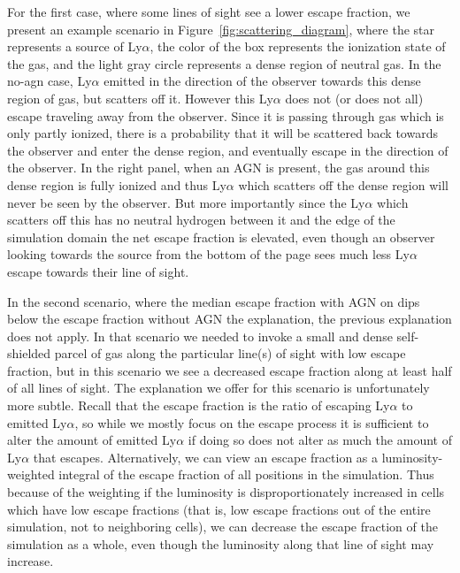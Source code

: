 For the first case, where some lines of sight see a lower escape fraction, we present an example scenario in Figure~\ref{fig:scattering_diagram}, where the star represents a source of Ly$\alpha$, the color of the box represents the ionization state of the gas, and the light gray circle represents a dense region of neutral gas.
In the no-agn case, Ly$\alpha$ emitted in the direction of the observer towards this dense region of gas, but scatters off it.
However this Ly$\alpha$ does not (or does not all) escape traveling away from the observer.
Since it is passing through gas which is only partly ionized, there is a probability that it will be scattered back towards the observer and enter the dense region, and eventually escape in the direction of the observer.
In the right panel, when an AGN is present, the gas around this dense region is fully ionized and thus Ly$\alpha$ which scatters off the dense region will never be seen by the observer.
But more importantly since the Ly$\alpha$ which scatters off this has no neutral hydrogen between it and the edge of the simulation domain the net escape fraction is elevated, even though an observer looking towards the source from the bottom of the page sees much less Ly$\alpha$ escape towards their line of sight.

In the second scenario, where the median escape fraction with AGN on dips below the escape fraction without AGN the explanation, the previous explanation does not apply.
In that scenario we needed to invoke a small and dense self-shielded parcel of gas along the particular line(s) of sight with low escape fraction, but in this scenario we see a decreased escape fraction along at least half of all lines of sight.
The explanation we offer for this scenario is unfortunately more subtle.
Recall that the escape fraction is the ratio of escaping Ly$\alpha$ to emitted Ly$\alpha$, so while we mostly focus on the escape process it is sufficient to alter the amount of emitted Ly$\alpha$ if doing so does not alter as much the amount of Ly$\alpha$ that escapes.
Alternatively, we can view an escape fraction as a luminosity-weighted integral of the escape fraction of all positions in the simulation.
Thus because of the weighting if the luminosity is disproportionately increased in cells which have low escape fractions (that is, low escape fractions out of the entire simulation, not to neighboring cells), we can decrease the escape fraction of the simulation as a whole, even though the luminosity along that line of sight may increase.

